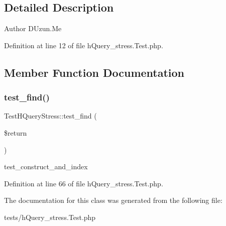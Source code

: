 \subsection{Detailed Description}
\begin{DoxyAuthor}{Author}
D\+Uzun.\+Me 
\end{DoxyAuthor}


Definition at line 12 of file h\+Query\+\_\+stress.\+Test.\+php.



\subsection{Member Function Documentation}
\mbox{\label{classTestHQueryStress_a4d0da0525a188b27349ffd2b72986fcc}} 
\subsubsection{\texorpdfstring{test\+\_\+find()}{test\_find()}}
{\footnotesize\ttfamily Test\+H\+Query\+Stress\+::test\+\_\+find (\begin{DoxyParamCaption}\item[{}]{\$return }\end{DoxyParamCaption})}

test\+\_\+construct\+\_\+and\+\_\+index 

Definition at line 66 of file h\+Query\+\_\+stress.\+Test.\+php.



The documentation for this class was generated from the following file\+:\begin{DoxyCompactItemize}
\item 
tests/h\+Query\+\_\+stress.\+Test.\+php\end{DoxyCompactItemize}
